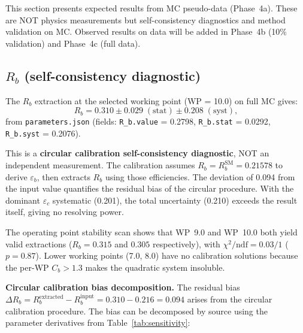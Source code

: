 \documentclass[11pt,a4paper]{article}
\begin{document}
This section presents expected results from MC pseudo-data (Phase~4a). These are
NOT physics measurements but self-consistency diagnostics and method validation
on MC. Observed results on data will be added in Phase~4b (10\% validation) and
Phase~4c (full data).

\subsection{$R_b$ (self-consistency diagnostic)}
\label{sec:result_rb}

The $R_b$ extraction at the selected working point (WP = 10.0) on full MC gives:
\begin{equation}
R_b = 0.310 \pm 0.029\;\mathrm{(stat)} \pm 0.208\;\mathrm{(syst)},
\label{eq:rb_result}
\end{equation}
from \texttt{parameters.json} (fields: \texttt{R\_b.value} = 0.2798,
\texttt{R\_b.stat} = 0.0292, \texttt{R\_b.syst} = 0.2076).

This is a \textbf{circular calibration self-consistency diagnostic}, NOT an independent
measurement. The calibration assumes $R_b = R_b^\mathrm{SM} = 0.21578$ to derive
$\varepsilon_b$, then extracts $R_b$ using those efficiencies. The deviation of 0.094
from the input value quantifies the residual bias of the circular procedure. With the
dominant $\varepsilon_c$ systematic (0.201), the total uncertainty (0.210)
exceeds the result itself, giving no resolving power.

The operating point stability scan shows that WP~9.0 and WP~10.0 both yield valid
extractions ($R_b = 0.315$ and $0.305$ respectively), with $\chi^2/\mathrm{ndf} = 0.03/1$
($p = 0.87$). Lower working points (7.0, 8.0) have no calibration solutions because
the per-WP $C_b > 1.3$ makes the quadratic system insoluble.

\textbf{Circular calibration bias decomposition.}
The residual bias $\Delta R_b = R_b^\mathrm{extracted} - R_b^\mathrm{input} =
0.310 - 0.216 = 0.094$ arises from the circular calibration procedure. The bias
can be decomposed by source using the parameter derivatives from
Table~\ref{tab:sensitivity}:
\end{document}
